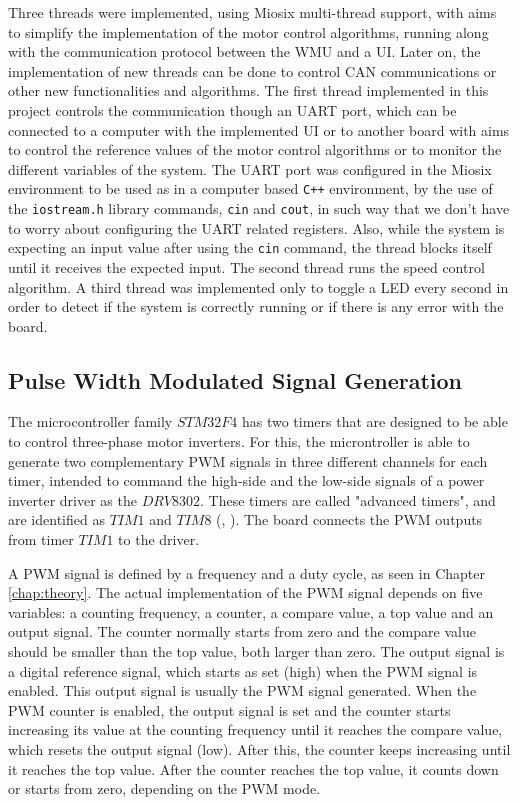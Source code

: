 Three threads were implemented, using Miosix multi-thread support, with aims to simplify the implementation of the motor control algorithms, running along with the communication protocol between the \ac{WMU} and a \acf{UI}. Later on, the implementation of new threads can be done to control \ac{CAN} communications or other new functionalities and algorithms. The first thread implemented in this project controls the communication though an \acf{UART} port, which can be connected to a computer with the implemented \ac{UI} or to another board with aims to control the reference values of the motor control algorithms or to monitor the different variables of the system. The \ac{UART} port was configured in the Miosix environment to be used as in a computer based \texttt{C++} environment, by the use of the \texttt{iostream.h} library commands, \texttt{cin} and \texttt{cout}, in such way that we don't have to worry about configuring the \ac{UART} related registers. Also, while the system is expecting an input value after using the \texttt{cin} command, the thread blocks itself until it receives the expected input. The second thread runs the speed control algorithm. A third thread was implemented only to toggle a LED every second in order to detect if the system is correctly running or if there is any error with the board.

\subsection{Pulse Width Modulated Signal Generation}

The microcontroller family $STM32F4$ has two timers that are designed to be able to control three-phase motor inverters. For this, the microntroller is able to generate two complementary \ac{PWM} signals in three different channels for each timer, intended to command the high-side and the low-side signals of a power inverter driver as the $DRV8302$. These timers are called "advanced timers", and are identified as $TIM1$ and $TIM8$ (\citeauthor{stm32}, \citeyear{stm32}). The board connects the \ac{PWM} outputs from timer $TIM1$ to the driver.

A \ac{PWM} signal is defined by a frequency and a duty cycle, as seen in Chapter \ref{chap:theory}. The actual implementation of the \ac{PWM} signal depends on five variables: a counting frequency, a counter, a compare value, a top value and an output signal. The counter normally starts from zero and the compare value should be smaller than the top value, both larger than zero. The output signal is a digital reference signal, which starts as set (high) when the \ac{PWM} signal is enabled. This output signal is usually the \ac{PWM} signal generated. When the \ac{PWM} counter is enabled, the output signal is set and the counter starts increasing its value at the counting frequency until it reaches the compare value, which resets the output signal (low). After this, the counter keeps increasing until it reaches the top value. After the counter reaches the top value, it counts down or starts from zero, depending on the \ac{PWM} mode.

